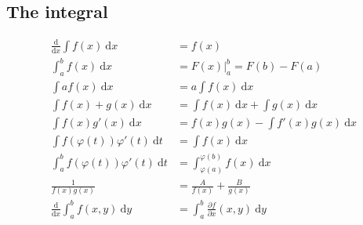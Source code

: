 \documentclass{article}
\theoremstyle{plain}
\theoremstyle{definition}
\newcommand{\dx}{\text{d}}
\begin{document}
\subsection{The integral}
\begin{align*}
	\frac{\dx}{\dx x}\int f(x)\ \dx x &= f(x) \\
	\int_a^b f(x)\ \dx x &= F(x)\big|_a^b=F(b)-F(a)\\
	\int af(x)\ \dx x&= a \int f(x)\ \dx x\\
	\int f(x)+g(x)\ \dx x&= \int f(x)\ \dx x+\int g(x)\ \dx x\\
	\int f(x)g'(x)\ \dx x &= f(x)g(x)-\int f'(x)g(x)\ \dx x\\
	\int f(\varphi(t))\varphi'(t)\ \dx t&=\int f(x)\ \dx x\\
	\int_a^b f(\varphi(t))\varphi'(t)\ \dx t&=\int_{\varphi(a)}^{\varphi(b)} 
	f(x)\ \dx x\\
	\frac{1}{f(x)g(x)} &= \frac{A}{f(x)}+\frac{B}{g(x)}\\
	\frac{\dx}{\dx x}\int_a^b f(x,y)\ \dx y &= \int_a^b \frac{\partial f}
	{\partial x}(x,y)\ \dx y
\end{align*}
\end{document}
